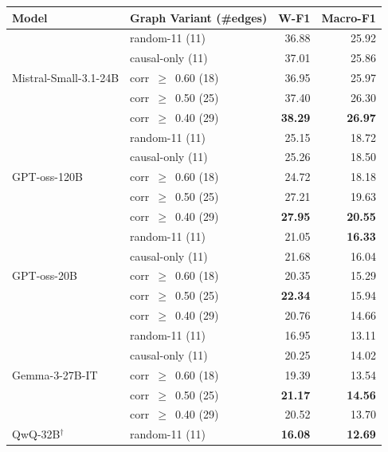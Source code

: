 \begin{table}[t]
\centering
\small
\setlength{\tabcolsep}{6pt}
\renewcommand{\arraystretch}{1.2}
\begin{tabular}{l l rr}
\toprule
\textbf{Model} & \textbf{Graph Variant (\#edges)} & \textbf{W-F1} & \textbf{Macro-F1} \\
\midrule
\multirow{5}{*}{Mistral-Small-3.1-24B}
  & random-11        (11) & 36.88          & 25.92          \\
  & causal-only      (11) & 37.01          & 25.86          \\
  & corr~$\geq$~0.60 (18) & 36.95          & 25.97          \\
  & corr~$\geq$~0.50 (25) & 37.40          & 26.30          \\
  & corr~$\geq$~0.40 (29) & \textbf{38.29} & \textbf{26.97} \\[3pt]
\multirow{5}{*}{GPT-oss-120B}
  & random-11        (11) & 25.15          & 18.72          \\
  & causal-only      (11) & 25.26          & 18.50          \\
  & corr~$\geq$~0.60 (18) & 24.72          & 18.18          \\
  & corr~$\geq$~0.50 (25) & 27.21          & 19.63          \\
  & corr~$\geq$~0.40 (29) & \textbf{27.95} & \textbf{20.55} \\[3pt]
\multirow{5}{*}{GPT-oss-20B}
  & random-11        (11) & 21.05          & \textbf{16.33} \\
  & causal-only      (11) & 21.68          & 16.04          \\
  & corr~$\geq$~0.60 (18) & 20.35          & 15.29          \\
  & corr~$\geq$~0.50 (25) & \textbf{22.34} & 15.94          \\
  & corr~$\geq$~0.40 (29) & 20.76          & 14.66          \\[3pt]
\multirow{5}{*}{Gemma-3-27B-IT}
  & random-11        (11) & 16.95          & 13.11          \\
  & causal-only      (11) & 20.25          & 14.02          \\
  & corr~$\geq$~0.60 (18) & 19.39          & 13.54          \\
  & corr~$\geq$~0.50 (25) & \textbf{21.17} & \textbf{14.56} \\
  & corr~$\geq$~0.40 (29) & 20.52          & 13.70          \\[3pt]
\multirow{5}{*}{QwQ-32B$^{\dagger}$}
  & random-11        (11) & \textbf{16.08} & \textbf{12.69} \\

\end{tabular}
\end{table}
